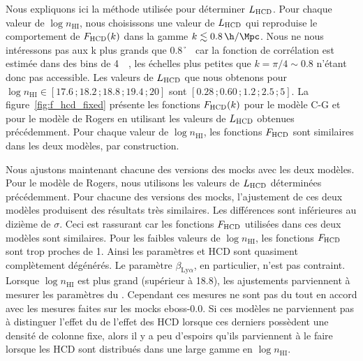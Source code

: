 \documentclass[11pt, twoside, a4paper, openright]{report}
\begin{document}
Nous expliquons ici la méthode utilisée pour déterminer $L_{\textsc{HCD}}$.
Pour chaque valeur de $\log n_{\mathrm{HI}}$, nous choisissons une valeur de $L_{\textsc{HCD}}$ qui reproduise le comportement de $F_{\textsc{HCD}}(k)$ dans la gamme $k \lesssim \SI{0.8}{\h\per\Mpc}$. %
Nous ne nous intéressons pas aux k plus grands que \SI{0.8}{\h\per\Mpc} car la fonction de corrélation est estimée dans des bins de \SI{4}{\perh\Mpc}, les échelles plus petites que $k = \pi / 4 \sim 0.8$ n'étant donc pas accessible.
Les valeurs de $L_{\textsc{HCD}}$ que nous obtenons pour $\log n_{\mathrm{HI}} \in [\num{17.6}\,;\num{18.2}\,;\num{18.8}\,;\num{19.4}\,;\num{20}]$ sont $[\num{0.28}\,; \num{0.60}\,; \num{1.2}\,; \num{2.5}\,; \num{5}]$.
La figure~\ref{fig:f_hcd_fixed} présente les fonctions $F_{\textsc{HCD}}(k)$ pour le modèle C-G et pour le modèle de Rogers en utilisant les valeurs de $L_{\textsc{HCD}}$ obtenues précédemment.
Pour chaque valeur de $\log n_{\mathrm{HI}}$, les fonctions $F_{\textsc{HCD}}$ sont similaires dans les deux modèles, par construction.

Nous ajustons maintenant chacune des versions des mocks avec les deux modèles. Pour le modèle de Rogers, nous utilisons les valeurs de $L_{\textsc{HCD}}$ déterminées précédemment. Pour chacune des versions des mocks, l'ajustement de ces deux modèles produisent des résultats très similaires. Les différences sont inférieures au dizième de $\sigma$.
Ceci est rassurant car les fonctions $F_{\textsc{HCD}}$ utilisées dans ces deux modèles sont similaires.
Pour les faibles valeurs de $\log n_{\mathrm{HI}}$, les fonctions $F_{\textsc{HCD}}$ sont trop proches de 1. Ainsi les paramètres \lya{} et HCD sont quasiment complètement dégénérés. Le paramètre $\beta_{\mathrm{Ly}\alpha}$, en particulier, n'est pas contraint.  Lorsque $\log n_{\mathrm{HI}}$ est plus grand (supérieur à \num{18.8}), les ajustements parviennent à mesurer les paramètres du \lya{}. Cependant ces mesures ne sont pas du tout en accord avec les mesures faites sur les mocks eboss-0.0.
Si ces modèles ne parviennent pas à distinguer l'effet du \lya{} de l'effet des HCD lorsque ces derniers possèdent une densité de colonne fixe, alors il y a peu d'espoirs qu'ils parviennent à le faire lorsque les HCD sont distribués dans une large gamme en $\log n_{\mathrm{HI}}$.
\end{document}
